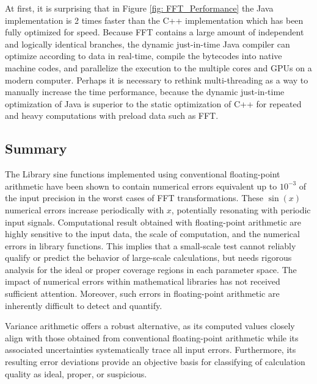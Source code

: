 \documentclass[twoside]{article}
\numberwithin{equation}{section}
\newcommand{\Verbose}{}
\begin{document}
At first, it is surprising that in Figure \ref{fig: FFT_Performance} the Java implementation is 2 times faster than the C++ implementation which has been fully optimized for speed.
Because FFT contains a large amount of independent and logically identical branches, the dynamic just-in-time Java compiler \cite{J9VM} can optimize according to data in real-time, compile the bytecodes into native machine codes, and parallelize the execution to the multiple cores and GPUs on a modern computer.
Perhaps it is necessary to rethink multi-threading as a way to manually increase the time performance, because the dynamic just-in-time optimization of Java is superior to the static optimization of C++ for repeated and heavy computations with preload data such as FFT. 

 


\subsection{Summary}

The Library sine functions implemented using conventional floating-point arithmetic have been shown to contain numerical errors equivalent up to $10^{-3}$ of the input precision in the worst cases of FFT transformations.
These $\sin(x)$ numerical errors increase periodically with $x$, potentially resonating with periodic input signals.
Computational result obtained with floating-point arithmetic are highly sensitive to the input data, the scale of computation, and the numerical errors in library functions.
This implies that a small-scale test cannot reliably qualify or predict the behavior of large-scale calculations, but needs rigorous analysis for the ideal or proper coverage regions in each parameter space.
The impact of numerical errors within mathematical libraries has not received sufficient attention.
Moreover, such errors in floating-point arithmetic are inherently difficult to detect and quantify.

Variance arithmetic offers a robust alternative, as its computed values closely align with those obtained from conventional floating-point arithmetic while its associated uncertainties systematically trace all input errors. 
Furthermore, its resulting error deviations provide an objective basis for classifying of calculation quality as ideal, proper, or suspicious.







\ifdefined\Verbose
\clearpage
\fi
\end{document}
